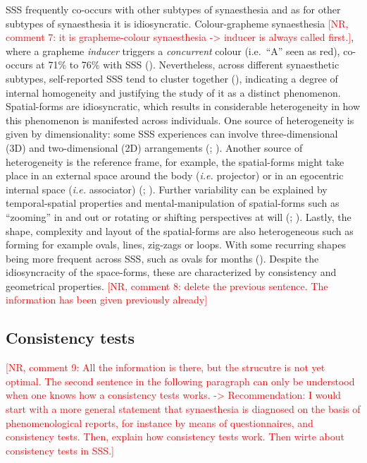 \documentclass[
  man,
  longtable,
  a4paper,
  nolmodern,
  notxfonts,
  notimes,
  colorlinks=true,linkcolor=blue,citecolor=blue,urlcolor=blue]{apa7}
\begin{document}
SSS frequently co-occurs with other subtypes of synaesthesia and as for
other subtypes of synaesthesia it is idiosyncratic. Colour-grapheme
synaesthesia
\textcolor{red}{[NR, comment 7: it is grapheme-colour synaesthesia -> inducer is always called first.]},
where a grapheme \emph{inducer} triggers a \emph{concurrent} colour
(i.e.~``A'' seen as red), co-occurs at 71\% to 76\% with SSS
(). Nevertheless, across
different synaesthetic subtypes, self-reported SSS tend to cluster
together (), indicating a
degree of internal homogeneity and justifying the study of it as a
distinct phenomenon. Spatial-forms are idiosyncratic, which results in
considerable heterogeneity in how this phenomenon is manifested across
individuals. One source of heterogeneity is given by dimensionality:
some SSS experiences can involve three-dimensional (3D) and
two-dimensional (2D) arrangements
(;
). Another source of
heterogeneity is the reference frame, for example, the spatial-forms
might take place in an external space around the body (\emph{i.e.}
projector) or in an egocentric internal space (\emph{i.e.} associator)
(;
). Further variability can
be explained by temporal-spatial properties and mental-manipulation of
spatial-forms such as ``zooming'' in and out or rotating or shifting
perspectives at will (;
). Lastly, the shape,
complexity and layout of the spatial-forms are also heterogeneous such
as forming for example ovals, lines, zig-zags or loops. With some
recurring shapes being more frequent across SSS, such as ovals for
months (). Despite the
idiosyncracity of the space-forms, these are characterized by
consistency and geometrical properties.
\textcolor{red}{[NR, comment 8: delete the previous sentence. The information has been given previously already]}

\subsection{Consistency tests}\label{sec-consistency-tests}

\textcolor{red}{[NR, comment 9: All the information is there, but the strucutre is not yet optimal. The second sentence in the following paragraph can only be understood when one knows how a consistency tests works. -> Recommendation: I would start with a more general statement that synaesthesia is diagnosed on the basis of phenomenological reports, for instance by means of questionnaires, and consistency tests. Then, explain how consistency tests work. Then wirte about consistency tests in SSS.]}
\end{document}
